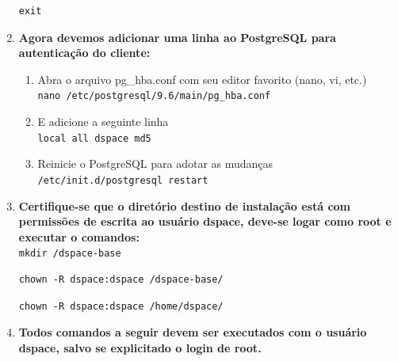 \documentclass[12pt,hidelinks]{article}
\begin{document}
\begin{enumerate}
             \begin{verbatim}
exit
            \end{verbatim}
            
        \item \textbf{Agora devemos adicionar uma linha ao PostgreSQL para autenticação do cliente:}\\
    
        \begin{enumerate}
            \item Abra o arquivo pg\_hba.conf com seu editor favorito (nano, vi, etc.)\\
            
                \texttt{nano /etc/postgresql/9.6/main/pg\_hba.conf}\\

            \item E adicione a seguinte linha\\
            
                \texttt{local     all     dspace    md5}\\
                
             \item Reinicie o PostgreSQL para adotar as mudanças\\
            
                \texttt{/etc/init.d/postgresql restart}\\

            \end{enumerate}
            
        \item \textbf{Certifique-se que o diretório destino de instalação está com permissões de escrita ao usuário dspace, deve-se logar como root e executar o comandos:}\\
        
            \texttt{mkdir /dspace-base}
            
             \begin{verbatim}
chown -R dspace:dspace /dspace-base/
            \end{verbatim}
            
            \begin{verbatim}
chown -R dspace:dspace /home/dspace/
            \end{verbatim}
            
        \item \textbf{Todos comandos a seguir devem ser executados com o usuário dspace, salvo se explicitado o login de root.}\\
        

\end{enumerate}
\end{document}
